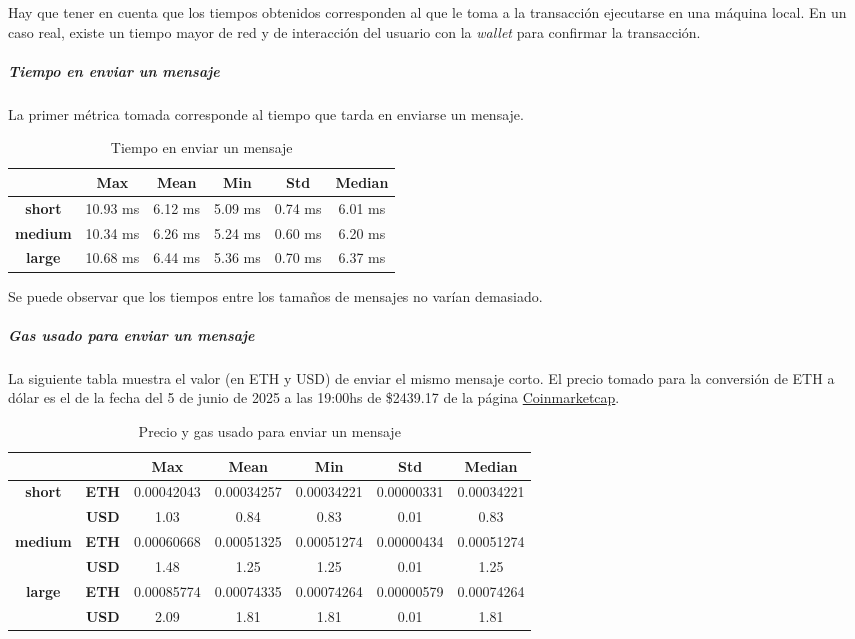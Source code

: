 Hay que tener en cuenta que los tiempos obtenidos corresponden al que le toma a la transacción ejecutarse en una máquina local. En un caso real, existe un tiempo mayor de red y de interacción del usuario con la \textit{wallet} para confirmar la transacción.

\subparagraph{Tiempo en enviar un mensaje}

La primer métrica tomada corresponde al tiempo que tarda en enviarse un mensaje.

\setlength\tabcolsep{10pt}
\begin{table}[!htbp]
    \centering
    \begin{tabular}{|c|c|c|c|c|c|}
    \hline
    & \textbf{Max} & \textbf{Mean} & \textbf{Min} & \textbf{Std} & \textbf{Median} \\
    \hline
    \textbf{short} & 10.93 ms & 6.12 ms & 5.09 ms & 0.74 ms & 6.01 ms \\
    \hline
    \textbf{medium} & 10.34 ms & 6.26 ms & 5.24 ms & 0.60 ms & 6.20 ms \\
    \hline
    \textbf{large} & 10.68 ms & 6.44 ms & 5.36 ms & 0.70 ms & 6.37 ms \\
    \hline
    \end{tabular}
    \caption{Tiempo en enviar un mensaje}
\end{table}

Se puede observar que los tiempos entre los tamaños de mensajes no varían demasiado.

\subparagraph{Gas usado para enviar un mensaje}

La siguiente tabla muestra el valor (en ETH y USD) de enviar el mismo mensaje corto. El precio tomado para la conversión de ETH a dólar es el de la fecha del 5 de junio de 2025 a las 19:00hs de \$2439.17 de la página \href{https://coinmarketcap.com/currencies/ethereum/}{Coinmarketcap}.

\setlength\tabcolsep{10pt}
\begin{table}[H]
    \centering
    \begin{tabular}{|c|c|c|c|c|c|c|}
    \hline
    & & \textbf{Max} & \textbf{Mean} & \textbf{Min} & \textbf{Std} & \textbf{Median} \\
    \hline
    \multirow{2}{*}{\textbf{short}} & \textbf{ETH} & 0.00042043 & 0.00034257 & 0.00034221 & 0.00000331 & 0.00034221 \\
    \cline{2-7}
    & \textbf{USD} & 1.03 & 0.84 & 0.83 & 0.01 & 0.83 \\
    \hline
    \multirow{2}{*}{\textbf{medium}} & \textbf{ETH} & 0.00060668 & 0.00051325 & 0.00051274 & 0.00000434 & 0.00051274 \\
    \cline{2-7}
    & \textbf{USD} & 1.48 & 1.25 & 1.25 & 0.01 & 1.25 \\
    \hline
    \multirow{2}{*}{\textbf{large}} & \textbf{ETH} & 0.00085774 & 0.00074335 & 0.00074264 & 0.00000579 & 0.00074264 \\
    \cline{2-7}
    & \textbf{USD} & 2.09 & 1.81 & 1.81 & 0.01 & 1.81 \\
    \hline
    \end{tabular}
    \caption{Precio y gas usado para enviar un mensaje}
\end{table}

